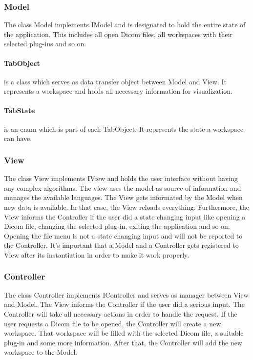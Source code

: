 \subsubsection{Model}
The class Model implements IModel and is designated to hold the entire state of the application. This includes all open Dicom files, all workspaces with their selected plug-ins and so on.
\paragraph{TabObject} is a class which serves as data transfer object between Model and View. It represents a workspace and holds all necessary information for visualization.
\paragraph{TabState} is an enum which is part of each TabObject. It represents the state a workspace can have.

\subsubsection{View}
The class View implements IView and holds the user interface without having any complex algorithms. The view uses the model as source of information and manages the available languages. The View gets informated by the Model when new data is available. In that case, the View reloads everything. Furthermore, the View informs the Controller if the user did a state changing input like opening a Dicom file, changing the selected plug-in, exiting the application and so on. Opening the file menu is not a state changing input and will not be reported to the Controller. It's important that a Model and a Controller gets registered to View after its instantiation in order to make it work properly.

\subsubsection{Controller}
The class Controller implements IController and serves as manager between View and Model. The View informs the Controller if the user did a serious input. The Controller will take all necessary actions in order to handle the request. If the user requests a Dicom file to be opened, the Controller will create a new workspace. That workspace will be filled with the selected Dicom file, a suitable plug-in and some more information. After that, the Controller will add the new workspace to the Model.

